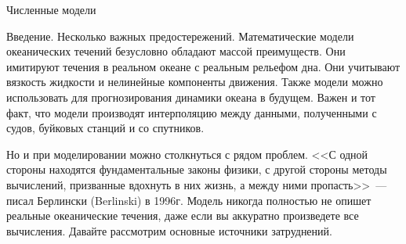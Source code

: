 \begin{chapter}{Численные модели}
\begin{section}{Введение. Несколько важных предостережений.}
Математические модели океанических течений безусловно обладают массой
преимуществ. Они имитируют течения в реальном океане с реальным
рельефом дна. Они учитывают вязкость жидкости и нелинейные компоненты
движения. Также модели можно использовать для прогнозирования динамики
океана в будущем. Важен и тот факт, что модели производят интерполяцию
между данными, полученными с судов, буйковых станций и со спутников.
%

Но и при моделировании можно столкнуться с рядом проблем. <<С одной
стороны находятся фундаментальные законы физики, с другой стороны
методы вычислений, призванные вдохнуть в них жизнь, а между ними
пропасть>>~--- писал Берлински (Berlinski) в 1996г. Модель никогда
полностью не опишет реальные океанические течения, даже если вы
аккуратно произведете все вычисления. Давайте рассмотрим основные
источники затруднений.
%


\end{section}
\end{chapter}
